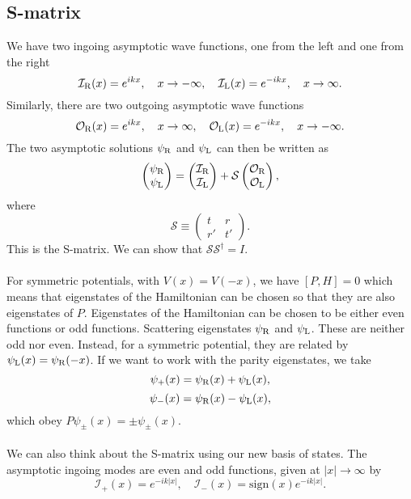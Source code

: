 \subsection{S-matrix}
We have two ingoing asymptotic wave functions, one from the left and one from the right
\[\mathcal{I}_{\rm R}(x) = e^{ikx} , \quad x \to -\infty , \quad \mathcal{I}_{\rm L}(x) = e^{-ikx} , \quad x \to \infty.\]
Similarly, there are two outgoing asymptotic wave functions
\[\mathcal{O}_{\rm R}(x) = e^{ikx} , \quad x \to \infty , \quad \mathcal{O}_{\rm L}(x) = e^{-ikx} , \quad x \to -\infty.\]
The two asymptotic solutions $\psi_{\rm R}$ and $\psi_{\rm L}$ can then be written as
\[\begin{pmatrix} \psi_{\rm R} \\ \psi_{\rm L} \end{pmatrix} =  
\begin{pmatrix} \mathcal{I}_{\rm R} \\ \mathcal{I}_{\rm L} \end{pmatrix} + 
\mathcal{S} \begin{pmatrix} \mathcal{O}_{\rm R} \\ \mathcal{O}_{\rm L} \end{pmatrix},\]
where
\[\mathcal{S} \equiv \begin{pmatrix}
t & r \\ r' & t'
\end{pmatrix} .\]
This is the S-matrix. We can show that $\mathcal{S}\mathcal{S}^{\dagger} = I$.
\\ \\
For symmetric potentials, with $V (x) = V (-x)$, we have $[P, H] = 0$ which means that eigenstates of the Hamiltonian can be chosen so that they are also eigenstates of $P$. Eigenstates of the Hamiltonian can
be chosen to be either even functions or odd functions.
Scattering eigenstates $\psi_{\rm R}$ and $\psi_{\rm L}$. These are neither odd nor even. Instead, for a symmetric potential, they are related by $\psi_{\rm L} (x) = \psi_{\rm R} (-x)$. If we want to work with the parity
eigenstates, we take
\[\psi_{+}(x) = \psi_{\rm R}(x) + \psi_{\rm L}(x),\]
\[\psi_{-}(x) = \psi_{\rm R}(x) - \psi_{\rm L}(x),\]
which obey $P\psi_{\pm}(x) = \pm \psi_{\pm}(x)$.
\\ \\
We can also think about the S-matrix using our new basis of states. The asymptotic ingoing modes are even and odd functions, given at $|x| \to \infty$ by
\[\mathcal{I}_{+}(x) = e^{-ik|x|} , \quad \mathcal{I}_{-}(x) = \mathrm{sign}(x) e^{-ik|x|}.\]
